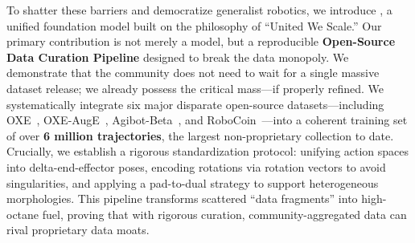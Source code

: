To shatter these barriers and democratize generalist robotics, we introduce \VLAFM{}, a unified foundation model built on the philosophy of ``United We Scale.'' Our primary contribution is not merely a model, but a reproducible \textbf{Open-Source Data Curation Pipeline} designed to break the data monopoly. We demonstrate that the community does not need to wait for a single massive dataset release; we already possess the critical mass—if properly refined. We systematically integrate six major disparate open-source datasets—including OXE~\cite{o2024oxe}, OXE-AugE~\cite{ji2025oxeauge}, Agibot-Beta~\cite{agibotbeta}, and RoboCoin~\cite{wu2025robocoin}—into a coherent training set of over \textbf{6 million trajectories}, the largest non-proprietary collection to date. Crucially, we establish a rigorous standardization protocol: unifying action spaces into delta-end-effector poses, encoding rotations via rotation vectors to avoid singularities, and applying a pad-to-dual strategy to support heterogeneous morphologies. This pipeline transforms scattered ``data fragments'' into high-octane fuel, proving that with rigorous curation, community-aggregated data can rival proprietary data moats.

